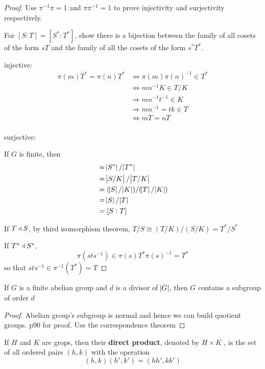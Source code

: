 \documentclass[11pt]{article}
\begin{document}
\begin{proof}
Use \(\pi^{-1}\pi=1\) and \(\pi\pi^{-1}=1\) to prove injectivity and surjectivity
respectively. 

For \([S:T]=[S^*:T^*]\), show there is a bijection between the family of all
cosets of the form \(sT\) and the family of all the cosets of the form
\(s^*T^*\).

injective:
\begin{align*}
\pi(m)T^*=\pi(n)T^*&\Leftrightarrow \pi(m)\pi(n)^{-1}\in T^*\\
&\Leftrightarrow mn^{-1}K\in T/K\\
&\Rightarrow mn^{-1}t^{-1}\in K\\
&\Rightarrow mn^{-1}=tk\in T\\
&\Leftrightarrow mT=nT\\
\end{align*}

surjective:


If \(G\) is finite, then
\begin{align*}
[S^*:T^*]&=\abs{S^*}/\abs{T^*}\\
&=\abs{S/K}/\abs{T/K}\\
&=(\abs{S}/\abs{K})/(\abs{T}/\abs{K})\\
&=\abs{S}/\abs{T}\\
&=[S:T]
\end{align*}

If \(T\triangleleft S\), by third isomorphism theorem, \(T/S\cong (T/K)/(S/K)=T^*/S^*\)

If \(T^*\triangleleft S^*\), 
\begin{equation*}
\pi(sts^{-1})\in \pi(s)T^*\pi(s)^{-1}=T^*
\end{equation*}
so that \(sts^{-1}\in \pi^{-1}(T^*)=T\)
\end{proof}


\begin{proposition}[]
\label{prop2.78}
If \(G\) is a finite abelian group and \(d\) is a divisor of \(\abs{G}\), then \(G\)
contains a subgroup of order \(d\)
\end{proposition}

\begin{proof}
Abelian group's subgroup is normal and hence we can build quotient groups.
p90 for proof. Use the correspondence theorem
\end{proof}

\begin{definition}[]
If \(H\) and \(K\) are grops, then their \textbf{direct product}, denoted by 
\(H\times K\) 
, is the set of all ordered pairs \((h,k)\) with the operation
\begin{equation*}
(h,k)(h',k')=(hh',kk')
\end{equation*}
\end{definition}
\end{document}
